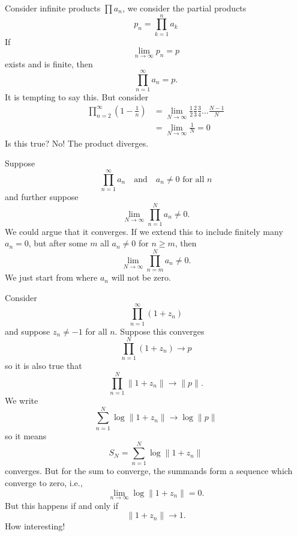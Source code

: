 Consider infinite products $\prod a_{n}$, we consider the partial
products
\begin{equation}
p_{n}=\prod^{n}_{k=1}a_{k}
\end{equation}
If
\begin{equation}
\lim_{n\to\infty}p_{n}=p
\end{equation}
exists and is finite, then
\begin{equation}
\prod^{\infty}_{n=1}a_{n}=p.
\end{equation}
It is tempting to say this. But consider
\begin{equation}
\begin{split}
\prod^{\infty}_{n=2}\left(1-\frac{1}{n}\right)&=\lim_{N\to\infty}\frac{1}{2}\frac{2}{3}\frac{3}{4}\dots\frac{N-1}{N}\\
&=\lim_{N\to\infty}\frac{1}{N}=0
\end{split}
\end{equation}
Is this true? No! The product diverges.

Suppose
\begin{equation}
\prod^{\infty}_{n=1}a_{n}\quad\mbox{and}\quad a_{n}\not=0\mbox{ for all }n
\end{equation}
and further suppose
\begin{equation}
\lim_{N\to\infty}\prod^{N}_{n=1}a_{n}\not=0.
\end{equation}
We could argue that it converges. If we extend this to include
finitely many $a_{n}=0$, but after some $m$ all $a_{n}\not=0$ for
$n\geq m$, then
\begin{equation}
\lim_{N\to\infty}\prod^{N}_{n=m}a_{n}\not=0.
\end{equation}
We just start from where $a_{n}$ will not be zero.

Consider
\begin{equation}
\prod^{\infty}_{n=1}(1+z_{n})
\end{equation}
and suppose $z_{n}\not=-1$ for all $n$. Suppose this converges
\begin{equation}
\prod^{N}_{n=1}(1+z_{n})\to p
\end{equation}
so it is also true that
\begin{equation}
\prod^{N}_{n=1}\|1+z_{n}\|\to\|p\|.
\end{equation}
We write
\begin{equation}
\sum^{N}_{n=1}\log\|1+z_{n}\|\to\log\|p\|
\end{equation}
so it means
\begin{equation}
S_{N}=\sum^{N}_{n=1}\log\|1+z_{n}\|
\end{equation}
converges. But for the sum to converge, the summands form a
sequence which converge to zero, i.e.,
\begin{equation}
\lim_{n\to\infty}\log\|1+z_{n}\|=0.
\end{equation}
But this happens if and only if
\begin{equation}
\|1+z_{n}\|\to 1.
\end{equation}
How interesting!

